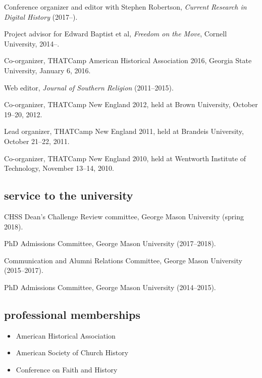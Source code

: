 \documentclass[11pt]{article}
\providecommand{\tightlist}{%
  \setlength{\itemsep}{0pt}\setlength{\parskip}{0pt}}
\begin{document}
Conference organizer and editor with Stephen Robertson, \emph{Current Research 
  in Digital History} (2017--).

Project advisor for Edward Baptist et al, \emph{Freedom on the Move}, Cornell 
University, 2014--.

Co-organizer, THATCamp American Historical Association 2016, Georgia State University, January 6, 2016.

Web editor, \emph{Journal of Southern Religion} (2011--2015).

Co-organizer, THATCamp New England 2012, held at Brown University,
October 19--20, 2012.

Lead organizer, THATCamp New England 2011, held at Brandeis University,
October 21--22, 2011.

Co-organizer, THATCamp New England 2010, held at Wentworth Institute of
Technology, November 13--14, 2010.


\subsection{service to the university}\label{service-university}

CHSS Dean's Challenge Review committee, George Mason University (spring 2018).

PhD Admissions Committee, George Mason University (2017--2018).

Communication and Alumni Relations Committee, George Mason University 
(2015--2017).

PhD Admissions Committee, George Mason University (2014--2015).






\subsection{professional memberships}\label{professional-memberships}

\begin{itemize}
    \tightlist
  \item
    American Historical Association
  \item
    American Society of Church History
  \item
    Conference on Faith and History
\end{itemize}
\end{document}
